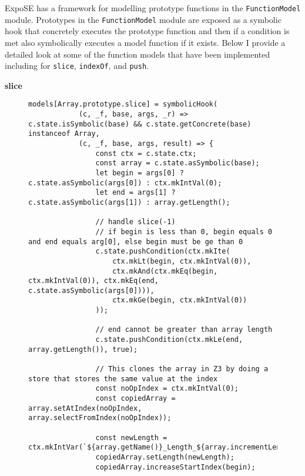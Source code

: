 \documentclass[]{final_report}
\begin{document}
ExpoSE has a framework for modelling prototype functions in the \lstinline|FunctionModel| module. Prototypes in the \lstinline|FunctionModel| module are exposed as a symbolic hook that concretely executes the prototype function and then if a condition is met also symbolically executes a model function if it exists. Below I provide a detailed look at some of the function models that have been implemented including for \lstinline|slice|, \lstinline|indexOf|, and \lstinline|push|.

\textbf{slice}
\begin{figure}[t]
\begin{lstlisting}
models[Array.prototype.slice] = symbolicHook(
            (c, _f, base, args, _r) => c.state.isSymbolic(base) && c.state.getConcrete(base) instanceof Array,
            (c, _f, base, args, result) => {
                const ctx = c.state.ctx;
                const array = c.state.asSymbolic(base);
                let begin = args[0] ? c.state.asSymbolic(args[0]) : ctx.mkIntVal(0);
                let end = args[1] ? c.state.asSymbolic(args[1]) : array.getLength();

                // handle slice(-1)
                // if begin is less than 0, begin equals 0 and end equals arg[0], else begin must be ge than 0
                c.state.pushCondition(ctx.mkIte(
                    ctx.mkLt(begin, ctx.mkIntVal(0)), 
                    ctx.mkAnd(ctx.mkEq(begin, ctx.mkIntVal(0)), ctx.mkEq(end, c.state.asSymbolic(args[0]))),
                    ctx.mkGe(begin, ctx.mkIntVal(0))
                ));

                // end cannot be greater than array length
                c.state.pushCondition(ctx.mkLe(end, array.getLength()), true);

                // This clones the array in Z3 by doing a store that stores the same value at the index
                const noOpIndex = ctx.mkIntVal(0);
                const copiedArray = array.setAtIndex(noOpIndex, array.selectFromIndex(noOpIndex));
                
                const newLength = ctx.mkIntVar(`${array.getName()}_Length_${array.incrementLengthCounter()}`);
                copiedArray.setLength(newLength);
                copiedArray.increaseStartIndex(begin);


\end{lstlisting}
\end{figure}
\end{document}
